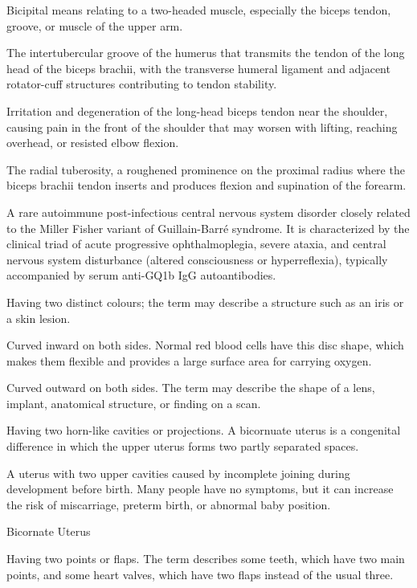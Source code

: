  Bicipital means relating to a two-headed muscle, especially the biceps tendon, groove, or muscle of the upper arm.

 The intertubercular groove of the humerus that transmits the tendon of the long head of
the biceps brachii, with the transverse humeral ligament and adjacent rotator-cuff
structures contributing to tendon stability.

 Irritation and degeneration of the long-head biceps tendon near the shoulder, causing pain in the front of the shoulder that may worsen with lifting, reaching overhead, or resisted elbow flexion.

 The radial tuberosity, a roughened prominence on the proximal radius where the biceps
brachii tendon inserts and produces flexion and supination of the forearm.

 A rare autoimmune post-infectious central nervous system disorder closely related to the Miller Fisher variant of Guillain-Barré syndrome. It is characterized by the clinical triad of acute progressive ophthalmoplegia, severe ataxia, and central nervous system disturbance (altered consciousness or hyperreflexia), typically accompanied by serum anti-GQ1b IgG autoantibodies.

 Having two distinct colours; the term may describe a structure such as an iris or a skin lesion.

 Curved inward on both sides. Normal red blood cells have this disc shape, which makes them flexible and provides a large surface area for carrying oxygen.

 Curved outward on both sides. The term may describe the shape of a lens, implant, anatomical structure, or finding on a scan.

 Having two horn-like cavities or projections. A bicornuate uterus is a congenital difference in which the upper uterus forms two partly separated spaces.

 A uterus with two upper cavities caused by incomplete joining during development before birth. Many people have no symptoms, but it can increase the risk of miscarriage, preterm birth, or abnormal baby position.

\synonyms
Bicornate Uterus

 Having two points or flaps. The term describes some teeth, which have two main points, and some heart valves, which have two flaps instead of the usual three.

